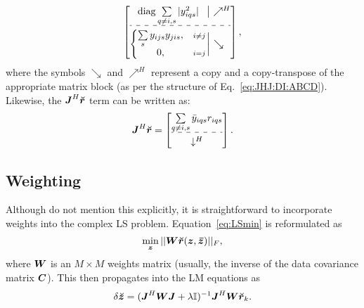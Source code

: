 \documentclass[useAMS,usenatbib]{mn2e}
\makeatletter
\newcommand{\II}{\mathbb{I}}
\newcommand{\mat}[1]{{\bmath{#1}}}
\newcommand{\JJ}{\mat{J}} %
\newcommand{\Matrix}[2]{\left [ \begin{array}{@{}#1@{}}#2\end{array} \right ]}
\newcommand{\Stack}[1]{\begin{array}{@{}c@{}}#1\end{array}}
\newcommand{\AUG}[1]{\bmath{\breve{#1}}}
\newcommand{\Zz}{\AUG{z}}
\newcommand{\Rr}{\AUG{r}}
\numberwithin{equation}{section}
\providecommand{\DIFaddbegin}{} %
\providecommand{\DIFdelend}{} %
\makeatother
\begin{document}
\begin{equation}%
\DIFdelend \DIFaddbegin \JHJblocks{
  \mathrm{diag} \sum\limits_{q\ne i,s} |y^2_{iqs}| 
}{
  \left \{ 
  \begin{array}{@{}cc@{}}
   \sum\limits_{s} y_{ijs}y_{jis},&{\scriptstyle i\ne j} \\
   0, &{\scriptstyle i=j}
  \end{array} \right . 
},
\end{equation}
where the symbols $\searrow$ and $\nearrow^H$ represent a copy and a copy-transpose of the appropriate matrix 
block (as per the structure of Eq.~\ref{eq:JHJ:DI:ABCD}). Likewise, the $\JJ^H\Rr$ term can be written as:
\begin{equation}
\label{eq:JHR:DI:tf}
\JJ^H\Rr 
= \Matrix{c}{
\sum\limits_{q\ne i,s} \bar{y}_{iqs} r_{iqs}   \\
 \hdashline \\[-8pt]
\downarrow^H
}.
\end{equation}

\subsection{Weighting}
\label{sec:DI:W}

Although \citet{ComplexOpt} do not mention this explicitly, it is straightforward to incorporate weights into the 
complex LS problem. Equation~\ref{eq:LSmin} is reformulated as
\begin{equation}
\label{eq:LSmin:w}
\min_{\bmath{z}} ||\mat{W} \Rr(\bmath{z},\bmath{\bar z})||_F,
\end{equation}
where $\mat{W}$ is an $M\times M$ weights matrix (usually, the inverse of the data covariance matrix $\mat{C}$). This then propagates into the LM equations as
\begin{equation}
\label{eq:LM:W}
\delta\Zz = (\JJ^H \mat{W} \JJ + \lambda\II)^{-1}\JJ^H \mat{W} \Rr_k.
\end{equation}
\end{document}
